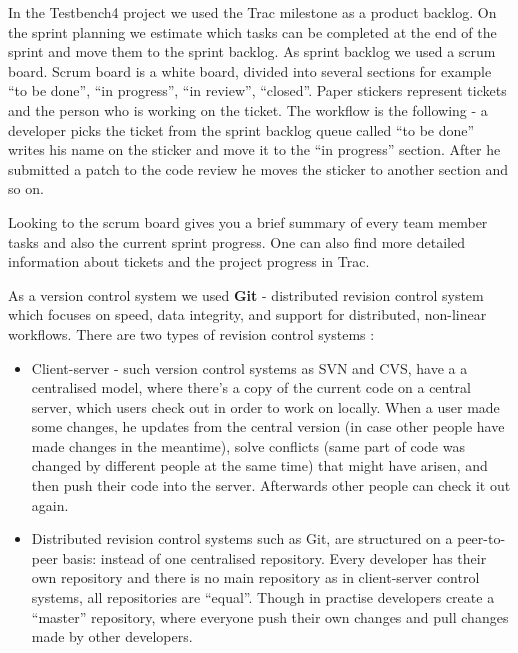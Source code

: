   In the Testbench4 project we used the Trac milestone as a product backlog. On
  the sprint planning we estimate which tasks can be completed at the end of the sprint 
  and move them to the sprint backlog. As sprint backlog we used a scrum board.
  Scrum board is a white board, divided into several sections for example ``to be done'', ``in progress'', ``in review'',
  ``closed''. Paper stickers represent tickets and the person who is working on
  the ticket. The workflow is the following - a developer picks the
  ticket from the sprint backlog queue called ``to be done'' 
  writes his name on the sticker and move it to the ``in progress'' section.
  After he submitted a patch to the code review he moves the sticker to another
  section and so on.
  
  Looking to the scrum board gives you a brief summary of every team member tasks and 
  also the current sprint progress. One can also find more detailed information
  about tickets and the project progress in Trac.
 
  
  As a version control system we used \textbf{Git} - distributed revision control system
  which focuses on speed, data integrity, and support for distributed,
  non-linear workflows. There are two types of revision control systems :
  
   \begin{itemize}
   \item Client-server - such version control systems as SVN and CVS, have a 
    a centralised model, where there's a copy of the current code on a central
    server, which users check out in order to work on locally. When a user made
    some changes, he updates from the central version (in case other people have
    made changes in the meantime), solve conflicts (same part of code was
    changed by different people at the same time) that might have arisen, and
    then push their code into the server. Afterwards other people can check it out again.

   \item Distributed revision control systems such as Git, are structured on a
    peer-to-peer basis: instead of one centralised repository. Every developer
    has their own repository and there is no main repository as in client-server
    control systems, all repositories are ``equal''. Though in practise developers
    create a ``master'' repository, where everyone push their own changes and pull
    changes made by other developers.
  \end{itemize}
  
